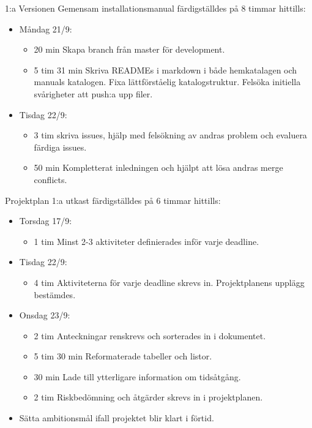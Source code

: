 \documentclass{TDP003mall}
\begin{document}
1:a Versionen Gemensam installationsmanual färdigställdes på 8 timmar hittills:
\begin{itemize}
	\item Måndag 21/9:
	\begin{itemize}
		\item 20 min Skapa branch från master för development.
		\item 5 tim 31 min Skriva READMEs i markdown i både hemkatalagen och manuals katalogen. Fixa lättförståelig katalogstruktur. Felsöka initiella svårigheter att push:a upp filer.
	\end{itemize}
	\item Tisdag 22/9:
	\begin{itemize}
        \item 3 tim skriva issues, hjälp med felsökning av andras problem och evaluera färdiga issues.
          \item 50 min Kompletterat inledningen och hjälpt att lösa andras merge conflicts.\\
	\end{itemize}
\end{itemize}

	Projektplan 1:a utkast färdigställdes på 6 timmar hittills:
\begin{itemize}
	\item Torsdag 17/9:
	\begin{itemize}
		\item 1 tim Minst 2-3 aktiviteter definierades inför varje deadline.
	\end{itemize}
	\item Tisdag 22/9:
	\begin{itemize}
		\item 4 tim Aktiviteterna för varje deadline skrevs in. Projektplanens upplägg bestämdes.
	\end{itemize}
	\item Onsdag 23/9:
	\begin{itemize}
		\item 2 tim Anteckningar renskrevs och sorterades in i dokumentet.
		\item 5 tim 30 min Reformaterade tabeller och listor.
		\item 30 min Lade till ytterligare information om tidsåtgång.
                \item 2 tim Riskbedömning och åtgärder skrevs in i projektplanen.
	\end{itemize}
	\item Sätta ambitionsmål ifall projektet blir klart i förtid.
	
\end{itemize}
\end{document}
